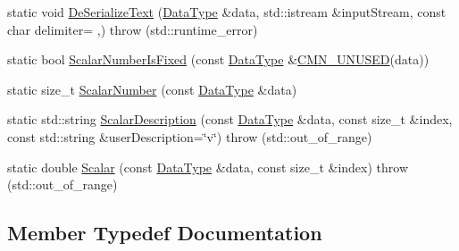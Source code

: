 \begin{DoxyCompactItemize}
\item 
static void \hyperlink{classcmn_data_3_01vct_dynamic_vector_3_01__element_type_01_4_01_4_a69af2b51e1d1a20c56d32fd0deeda766}{De\+Serialize\+Text} (\hyperlink{classcmn_data_3_01vct_dynamic_vector_3_01__element_type_01_4_01_4_a00a493d9c26fcb200ced1375b3500d17}{Data\+Type} \&data, std\+::istream \&input\+Stream, const char delimiter= \textquotesingle{},\textquotesingle{})  throw (std\+::runtime\+\_\+error)
\item 
static bool \hyperlink{classcmn_data_3_01vct_dynamic_vector_3_01__element_type_01_4_01_4_a2d9e5da4edd6045b601d9da21ffb6f61}{Scalar\+Number\+Is\+Fixed} (const \hyperlink{classcmn_data_3_01vct_dynamic_vector_3_01__element_type_01_4_01_4_a00a493d9c26fcb200ced1375b3500d17}{Data\+Type} \&\hyperlink{cmn_portability_8h_a021894e2626935fa2305434b1e893ff6}{C\+M\+N\+\_\+\+U\+N\+U\+S\+E\+D}(data))
\item 
static size\+\_\+t \hyperlink{classcmn_data_3_01vct_dynamic_vector_3_01__element_type_01_4_01_4_a0f95436e4701b5eed4a2c6be1d6bcf70}{Scalar\+Number} (const \hyperlink{classcmn_data_3_01vct_dynamic_vector_3_01__element_type_01_4_01_4_a00a493d9c26fcb200ced1375b3500d17}{Data\+Type} \&data)
\item 
static std\+::string \hyperlink{classcmn_data_3_01vct_dynamic_vector_3_01__element_type_01_4_01_4_a121e53ceebd6cee4395286ab91d66412}{Scalar\+Description} (const \hyperlink{classcmn_data_3_01vct_dynamic_vector_3_01__element_type_01_4_01_4_a00a493d9c26fcb200ced1375b3500d17}{Data\+Type} \&data, const size\+\_\+t \&index, const std\+::string \&user\+Description=\char`\"{}v\char`\"{})  throw (std\+::out\+\_\+of\+\_\+range)
\item 
static double \hyperlink{classcmn_data_3_01vct_dynamic_vector_3_01__element_type_01_4_01_4_a7584fc11f9661a815dc1aaa3d516e59d}{Scalar} (const \hyperlink{classcmn_data_3_01vct_dynamic_vector_3_01__element_type_01_4_01_4_a00a493d9c26fcb200ced1375b3500d17}{Data\+Type} \&data, const size\+\_\+t \&index)  throw (std\+::out\+\_\+of\+\_\+range)
\end{DoxyCompactItemize}


\subsection{Member Typedef Documentation}
\hypertarget{classcmn_data_3_01vct_dynamic_vector_3_01__element_type_01_4_01_4_a00a493d9c26fcb200ced1375b3500d17}{}
